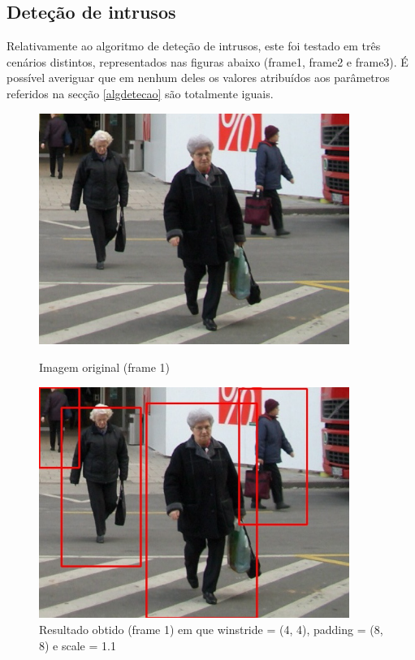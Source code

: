 \subsection{Deteção de intrusos}

Relativamente ao algoritmo de deteção de intrusos, este foi testado em três cenários distintos, representados nas figuras abaixo (frame1, frame2 e frame3). É possível averiguar que em nenhum deles os valores atribuídos aos parâmetros referidos na secção \ref{algdetecao} são totalmente iguais.




\begin{figure}[h]
	\centering
	\begin{minipage}[b]{0.49\textwidth}
		\centering
		\includegraphics[width=0.9\textwidth]{img/vision/exemplos/frame1.jpg}
		\caption[Imagem original (frame 1)]{Imagem original (frame 1) \newline \newline}
		\label{bluetth05-res}
	\end{minipage}
	\hfill
	\begin{minipage}[b]{0.49\textwidth}
		\centering
		\includegraphics[width=0.9\textwidth]{img/vision/exemplos/result_frame1.jpg}
		\caption[Resultado obtido (frame 1)]{Resultado obtido (frame 1) em que  winstride = (4, 4), padding = (8, 8) e scale = 1.1}
		\label{comimage1esquema}
	\end{minipage}
\end{figure}



